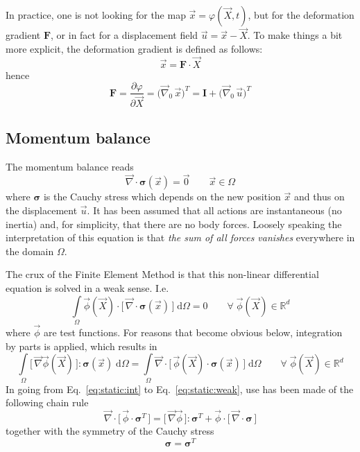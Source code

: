 \documentclass[times,namecite]{goose-article}
\begin{document}
In practice, one is not looking for the map $\vec{x} = \varphi(\vec{X},t)$, but for the deformation gradient $\bm{F}$,  or in fact for a displacement field $\vec{u} = \vec{x} - \vec{X}$. To make things a bit more explicit, the deformation gradient is defined as follows:
\begin{equation}
  \vec{x} = \bm{F} \cdot \vec{X}
\end{equation}
hence
\begin{equation}
  \bm{F}
  =
  \frac{\partial \varphi}{\partial \vec{X}}
  =
  \big( \vec{\nabla}_0 \, \vec{x} \big)^T
  =
  \bm{I} + \big( \vec{\nabla}_0 \, \vec{u} \big)^T
\end{equation}

\subsection{Momentum balance}

The momentum balance reads
\begin{equation}
\label{eq:static:momentum}
  \vec{\nabla} \cdot \bm{\sigma}(\vec{x}) = \vec{0}
  \qquad
  \vec{x} \in \Omega
\end{equation}
where $\bm{\sigma}$ is the Cauchy stress which depends on the new position $\vec{x}$ and thus on the displacement $\vec{u}$. It has been assumed that all actions are instantaneous (no inertia) and, for simplicity, that there are no body forces. Loosely speaking the interpretation of this equation is that \emph{the sum of all forces vanishes} everywhere in the domain $\Omega$.

The crux of the Finite Element Method is that this non-linear differential equation is solved in a weak sense. I.e.
\begin{equation}
\label{eq:static:int}
  \int\limits_\Omega
    \vec{\phi}(\vec{X}) \cdot \big[\, \vec{\nabla} \cdot \bm{\sigma}(\vec{x}) \,\big] \;
  \mathrm{d}\Omega
  =
  0
  \qquad
  \forall \; \vec{\phi}(\vec{X}) \in \mathbb{R}^d
\end{equation}
where $\vec{\phi}$ are test functions. For reasons that become obvious below, integration by parts is applied, which results in
\begin{equation}
\label{eq:static:weak}
  \int\limits_\Omega
    \big[\, \vec{\nabla} \vec{\phi}(\vec{X}) \,\big] : \bm{\sigma}(\vec{x}) \;
  \mathrm{d}\Omega
  =
  \int\limits_\Omega
    \vec{\nabla}
    \cdot
    \big[\, \vec{\phi}(\vec{X}) \cdot \bm{\sigma}(\vec{x}) \,\big] \;
  \mathrm{d}\Omega
  \qquad
  \forall \; \vec{\phi}(\vec{X}) \in \mathbb{R}^d
\end{equation}
In going from Eq.~\eqref{eq:static:int} to Eq.~\eqref{eq:static:weak}, use has been made of the following chain rule
\begin{equation}
  \vec{\nabla} \cdot \big[\, \vec{\phi} \cdot \bm{\sigma}^T \,\big]
  =
  \big[\, \vec{\nabla} \vec{\phi} \,\big] : \bm{\sigma}^T
  +
  \vec{\phi} \cdot \big[\, \vec{\nabla} \cdot \bm{\sigma} \,\big]
\end{equation}
together with the symmetry of the Cauchy stress
\begin{equation}
  \bm{\sigma} = \bm{\sigma}^T
\end{equation}
\end{document}
